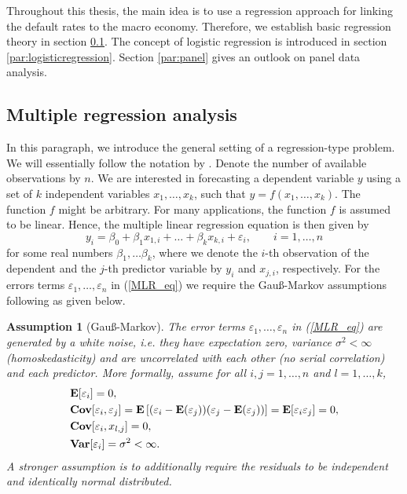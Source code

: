 \documentclass[a4paper, 11pt]{scrreprt}
\newtheorem{Assumption}[Theorem]{Assumption}
\newcommand{\ew}{\mbox{\textbf{E}}}
\newcommand{\var}{\mbox{\textbf{Var}}}
\newcommand{\cov}{\mbox{\textbf{Cov}}}
\begin{document}
Throughout this thesis, the main idea is to use a regression approach for linking the default rates to the macro economy. Therefore, we establish basic regression theory in section \ref{par:regression}. The concept of logistic regression is introduced in section \ref{par:logisticregression}. Section \ref{par:panel} gives an outlook on panel data analysis.

\subsection{Multiple regression analysis}\label{par:regression}
 
In this paragraph, we introduce the general setting of a regression-type problem. We will essentially follow the notation by \textcite[chapter 5]{hyndman2014forecasting}. Denote the number of available observations by $n$. We are interested in forecasting a dependent variable $y$ using a set of $k$ independent variables $x_1, \ldots, x_k$, such that
$y=f(x_1,\ldots,x_k)$. The function $f$ might be arbitrary. For many applications, the function $f$ is assumed to be linear. Hence, the multiple linear regression equation is then given by 
\begin{equation}\label{MLR_eq}
y_i = \beta_0 + \beta_1 x_{1,i} + \ldots + \beta_k x_{k,i} + \varepsilon_i, \qquad i=1,\ldots, n
\end{equation}
for some real numbers $\beta_1, \ldots \beta_k$, where we denote the $i$-th observation of the dependent and the $j$-th predictor variable by $y_i$ and $x_{j,i}$, respectively. 
For the errors terms $\varepsilon_1, \ldots, \varepsilon_n$ in (\ref{MLR_eq}) we require the Gauß-Markov assumptions following \textcite[chapter 1.1.2]{ameniya1985advance} as given below.

\begin{Assumption}[Gauß-Markov] \upshape \label{assumption:gauss}
The error terms $\varepsilon_1, \ldots, \varepsilon_n$ in (\ref{MLR_eq}) are generated by a white noise, i.e. they have expectation zero, variance $\sigma^2 < \infty$ (homoskedasticity) and are uncorrelated with each other (no serial correlation) and each predictor. More formally, assume for all $i,j = 1,\ldots, n$ and $l=1,\ldots,k$,	
	\begin{align}
	& \ew[\varepsilon_i] = 0, \\
	&\cov[\varepsilon_i, \varepsilon_j] = \ew \left[ (\varepsilon_i - \ew(\varepsilon_j)) (\varepsilon_j - \ew(\varepsilon_j)) \right] = \ew[\varepsilon_i \varepsilon_j] = 0, \\
	&\cov[\varepsilon_i, x_{l,j}] = 0, \\
	& \var[\varepsilon_i] = \sigma^2 < \infty.
	\end{align}
A stronger assumption is to additionally require the residuals to be independent and identically normal distributed.
\end{Assumption}
\end{document}
